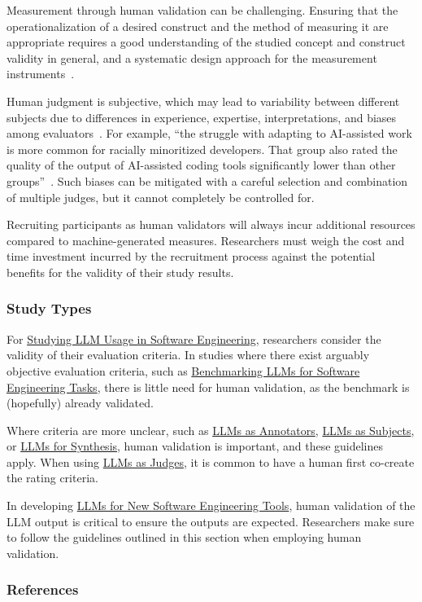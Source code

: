 Measurement through human validation can be challenging.
Ensuring that the operationalization of a desired construct and the method of measuring it are appropriate requires a good understanding of the studied concept and construct validity in general, and a systematic design approach for the measurement instruments~\cite{DBLP:journals/tse/SjobergB23}.

Human judgment is subjective, which may lead to variability between different subjects due to differences in experience, expertise, interpretations, and biases among evaluators~\cite{DBLP:journals/pacmhci/McDonaldSF19}.
For example, \enquote{the struggle with adapting to AI-assisted work is more common for racially minoritized developers. That group also rated the quality of the output of AI-assisted coding tools significantly lower than other groups}~\cite{hicks_lee_foster-marks_2025}.
Such biases can be mitigated with a careful selection and combination of multiple judges, but it cannot completely be controlled for.

Recruiting participants as human validators will always incur additional resources compared to machine-generated measures.
Researchers must weigh the cost and time investment incurred by the recruitment process against the potential benefits for the validity of their study results.


\subsubsection{Study Types}

For \href{/study-types/#studying-llm-usage-in-software-engineering}{Studying LLM Usage in Software Engineering}, researchers \should consider the validity of their evaluation criteria.
In studies where there exist arguably objective evaluation criteria, such as \href{/study-types/#benchmarking-llms-for-software-engineering-tasks}{Benchmarking LLMs for Software Engineering Tasks}, there is little need for human validation, as the benchmark is (hopefully) already validated.

Where criteria are more unclear, such as \href{/study-types/#llms-as-annotators}{LLMs as Annotators}, \href{/study-types/#llms-as-subjects}{LLMs as Subjects}, or \href{/study-types/#llms-for-synthesis}{LLMs for Synthesis}, human validation is important, and these guidelines apply. When using \href{/study-types/#llms-as-judges}{LLMs as Judges}, it is common to have a human first co-create the rating criteria. 

In developing \href{/study-types/#llms-for-new-software-engineering-tools}{LLMs for New Software Engineering Tools}, human validation of the LLM output is critical to ensure the outputs are expected.
Researchers \should make sure to follow the guidelines outlined in this section when employing human validation.

\subsubsection{References}





